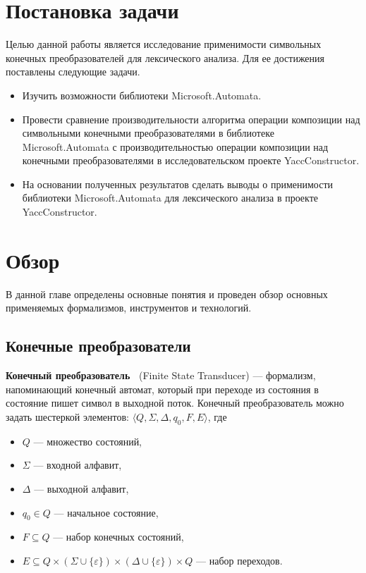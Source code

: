 \documentclass[14pt]{matmex-diploma}
\begin{document}


\section{Постановка задачи}
Целью данной работы является исследование применимости символьных конечных преобразователей для лексического анализа. Для ее достижения поставлены следующие задачи.
\begin{itemize}
    \item Изучить возможности библиотеки Microsoft.Automata.
\item Провести сравнение производительности алгоритма операции композиции над символьными конечными преобразователями в библиотеке Microsoft.Automata с производительностью операции композиции над конечными преобразователями в исследовательском проекте YaccConstructor.
\item На основании полученных результатов сделать выводы о применимости библиотеки Microsoft.Automata для лексического анализа в проекте YaccConstructor.
  \end{itemize}

\section{Обзор}
В данной главе определены основные понятия и проведен обзор основных применяемых формализмов, инструментов и технологий.

\subsection{Конечные преобразователи}
\textbf{Конечный преобразователь~\cite{FST}} (Finite State Transducer) --- формализм, напоминающий конечный автомат, который при переходе из состояния в состояние пишет символ в выходной поток.
Конечный преобразователь можно задать шестеркой элементов: 
$\langle Q, \Sigma, \Delta, q_0, F, E \rangle$, где

\begin{itemize}
\item $Q$ --- множество состояний, 
\item $\Sigma$ --- входной алфавит, 
\item $\Delta$ --- выходной алфавит, 
\item $q_0 \in Q$ --- начальное состояние, 
\item $F \subseteq Q$ --- набор конечных состояний, 
\item $E \subseteq Q \times (\Sigma \cup \{\varepsilon\}) \times (\Delta \cup \{\varepsilon\})  \times Q$ --- набор переходов. 
\end{itemize}
\end{document}

